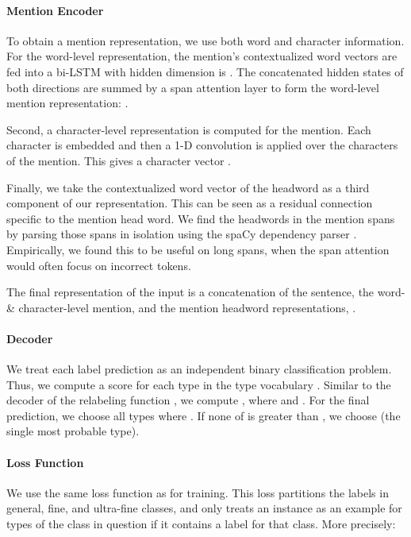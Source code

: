\documentclass[11pt,a4paper]{article}
\begin{document}
\vspace{-4pt}
\paragraph{Mention Encoder} To obtain a mention representation, we use both word and character information. For the word-level representation, the mention's contextualized word vectors  are fed into a bi-LSTM with hidden dimension is . The concatenated hidden states of both directions are summed by a span attention layer to form the word-level mention representation: .

Second, a character-level representation is computed for the mention. Each character is embedded and then a 1-D convolution \cite{nlpfromscratch11} is applied over the characters of the mention. This gives a character vector .

Finally, we take the contextualized word vector of the headword   as a third component of our representation.  This can be seen as a residual connection \cite{resnet16} specific to the mention head word.  We find the headwords in the mention spans by parsing those spans in isolation using the spaCy dependency parser \cite{spacy_15}. Empirically, we found this to be useful on long spans, when the span attention would often focus on incorrect tokens.

The final representation of the input  is a concatenation of the sentence, the word- \& character-level mention, and the mention headword representations, .

\vspace{-4pt}
\paragraph{Decoder}  We treat each label prediction as an independent binary classification problem. Thus, we compute a score for each type in the type vocabulary . 
Similar to the decoder of the relabeling function , we compute , where  and  . For the final prediction, we choose all types  where . If none of  is greater than , we choose  (the single most probable type).

\vspace{-4pt}
\paragraph{Loss Function} We use the same loss function as \citet{Eunsol_Choi_18} for training. This loss partitions the labels in general, fine, and ultra-fine classes, and only treats an instance as an example for types of the class in question if it contains a label for that class. More precisely:
\vspace{-6pt}
\end{document}

